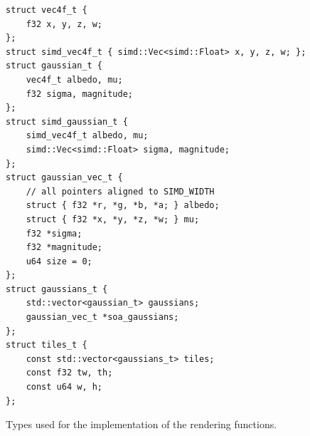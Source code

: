 \documentclass[a4paper, 11pt]{memoir}
\begin{document}
    \begin{listing}[H]
        \begin{verbatim}
struct vec4f_t {
    f32 x, y, z, w;
};
struct simd_vec4f_t { simd::Vec<simd::Float> x, y, z, w; };
struct gaussian_t {
    vec4f_t albedo, mu;
    f32 sigma, magnitude;
};
struct simd_gaussian_t {
    simd_vec4f_t albedo, mu;
    simd::Vec<simd::Float> sigma, magnitude;
};
struct gaussian_vec_t {
    // all pointers aligned to SIMD_WIDTH
    struct { f32 *r, *g, *b, *a; } albedo;
    struct { f32 *x, *y, *z, *w; } mu;
    f32 *sigma;
    f32 *magnitude;
    u64 size = 0;
};
struct gaussians_t {
    std::vector<gaussian_t> gaussians;
    gaussian_vec_t *soa_gaussians;
};
struct tiles_t {
    const std::vector<gaussians_t> tiles;
    const f32 tw, th;
    const u64 w, h;
};
        \end{verbatim}
        \caption{Types used for the implementation of the rendering functions.}
        \label{lst:types_vrt_full}
    \end{listing}

    \backmatter
    \printglossaries
    \printbibliography[heading=bibintoc]
\end{document}
